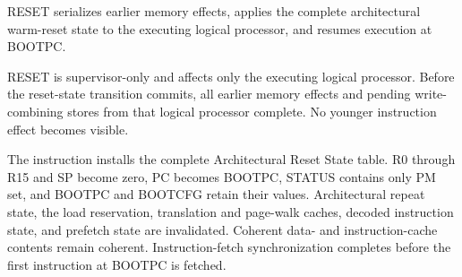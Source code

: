 RESET serializes earlier memory effects, applies the complete architectural warm-reset state to the executing logical processor, and resumes execution at BOOTPC.

RESET is supervisor-only and affects only the executing logical processor. Before the reset-state transition commits,
all earlier memory effects and pending write-combining stores from that logical processor complete. No younger
instruction effect becomes visible.

The instruction installs the complete Architectural Reset State table. R0 through R15 and SP become zero, PC becomes
BOOTPC, STATUS contains only PM set, and BOOTPC and BOOTCFG retain their values. Architectural repeat state, the load
reservation, translation and page-walk caches, decoded instruction state, and prefetch state are invalidated.
Coherent data- and instruction-cache contents remain coherent. Instruction-fetch synchronization completes before the
first instruction at BOOTPC is fetched.
